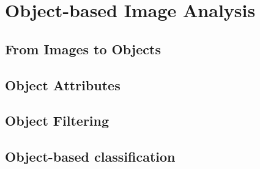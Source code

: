 
\chapter{Object-based Image Analysis }\label{sec:OBIA}



\section{From Images to Objects}\label{sec:FromImagesToObjects}
%

\section{Object Attributes}\label{sec:ObjectAttributes}


\section{Object Filtering}

\section{Object-based classification}
